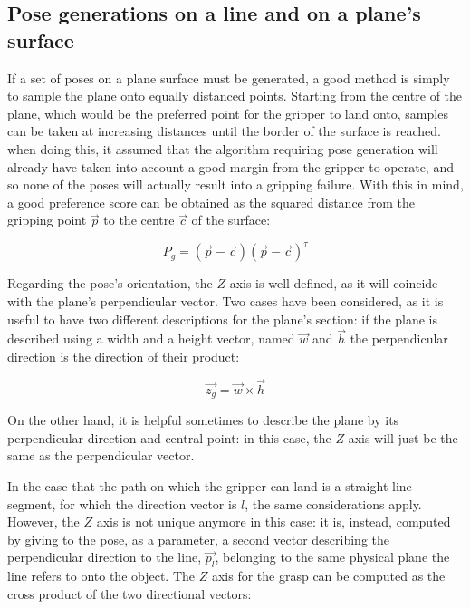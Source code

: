 \subsection{Pose generations on a line and on a plane's surface} \label{sec:pose-generation-line-plane}
If a set of poses on a plane surface must be generated, a good method is simply
to sample the plane onto equally distanced points. Starting from the centre of
the plane, which would be the preferred point for the gripper to land onto,
samples can be taken at increasing distances until the border of the surface is
reached. when doing this, it assumed that the algorithm requiring pose
generation will already have taken into account a good margin from the gripper
to operate, and so none of the poses will actually result into a gripping
failure. With this in mind, a good preference score can be obtained as the
squared distance from the gripping point $\vec{p}$ to the centre $\vec{c}$ of the surface:

\begin{equation}
P_{g}=(\vec{p}-\vec{c})(\vec{p}-\vec{c})^\tau
\end{equation}

Regarding the pose's orientation, the $Z$ axis is well-defined, as it will
coincide with the plane's perpendicular vector. Two cases have been considered,
as it is useful to have two different descriptions for the plane's section: if
the plane is described using a width and a height vector, named $\vec{w}$ and $\vec{h}$ the perpendicular
direction is the direction of their product:

\begin{equation}
  \vec{z_{g}}=\vec{w} \times \vec{h}
\end{equation}

On the other hand, it is helpful sometimes to describe the plane by its
perpendicular direction and central point: in this case, the $Z$ axis will just
be the same as the perpendicular vector.

In the case that the path on which the gripper can land is a straight
line segment, for which the direction vector is $l$, the same considerations apply. However, the $Z$ axis is
not unique anymore in this case: it is, instead, computed by giving
to the pose, as a parameter, a second vector describing the
perpendicular direction to the line, $\vec{p_l}$, belonging to the
same physical plane the line refers to onto the object. The $Z$ axis
for the grasp can be computed as the cross product of the two
directional vectors:

